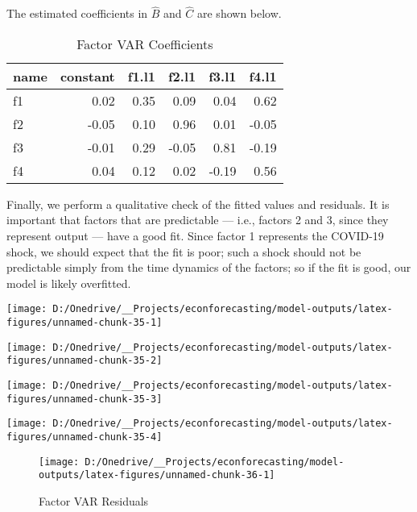 \documentclass[11pt, letterpaper]{article}\usepackage[]{graphicx}\usepackage[]{color}
\begin{document}
The estimated coefficients in $\widehat{B}$ and $\widehat{C}$ are shown below.
\begin{table}[H]
\centering
\begingroup\footnotesize
\begin{tabular}{lrrrrr}
  \hline
name & constant & f1.l1 & f2.l1 & f3.l1 & f4.l1 \\ 
  \hline
f1 & 0.02 & 0.35 & 0.09 & 0.04 & 0.62 \\ 
  f2 & -0.05 & 0.10 & 0.96 & 0.01 & -0.05 \\ 
  f3 & -0.01 & 0.29 & -0.05 & 0.81 & -0.19 \\ 
  f4 & 0.04 & 0.12 & 0.02 & -0.19 & 0.56 \\ 
   \hline
\end{tabular}
\endgroup
\caption{Factor VAR Coefficients} 
\end{table}



Finally, we perform a qualitative check of the fitted values and residuals. It is important that factors that are predictable --- i.e., factors 2 and 3, since they represent output --- have a good fit. Since factor 1 represents the COVID-19 shock, we should expect that the fit is poor; such a shock should not be predictable simply from the time dynamics of the factors; so if the fit is good, our model is likely overfitted.


{\centering \texttt{[image: D:/Onedrive/\_\_Projects/econforecasting/model-outputs/latex-figures/unnamed-chunk-35-1]} 

}




{\centering \texttt{[image: D:/Onedrive/\_\_Projects/econforecasting/model-outputs/latex-figures/unnamed-chunk-35-2]} 

}




{\centering \texttt{[image: D:/Onedrive/\_\_Projects/econforecasting/model-outputs/latex-figures/unnamed-chunk-35-3]} 

}




{\centering \texttt{[image: D:/Onedrive/\_\_Projects/econforecasting/model-outputs/latex-figures/unnamed-chunk-35-4]} 

}





\begin{figure}[H]

{\centering \texttt{[image: D:/Onedrive/\_\_Projects/econforecasting/model-outputs/latex-figures/unnamed-chunk-36-1]} 

}

\caption[Factor VAR Residuals]{Factor VAR Residuals}\label{fig:unnamed-chunk-36}
\end{figure}
\end{document}

